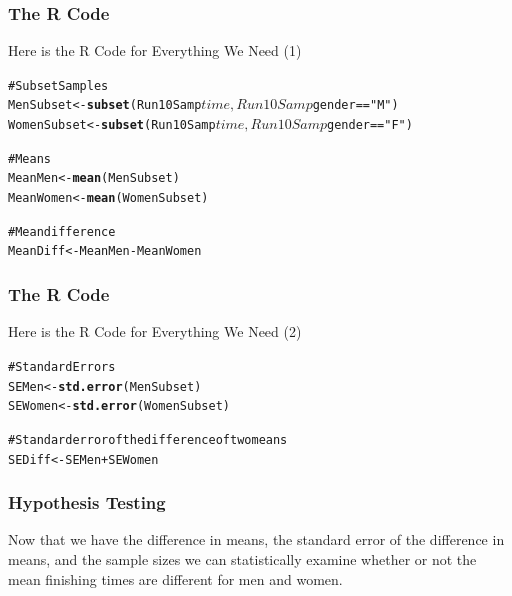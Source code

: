 \documentclass{beamer}\usepackage{graphicx, color}
\makeatletter
\newcommand{\hlfunctioncall}[1]{\textcolor[rgb]{0.501960784313725,0,0.329411764705882}{\textbf{#1}}}%
\newcommand{\hlstring}[1]{\textcolor[rgb]{0.6,0.6,1}{#1}}%
\newcommand{\hlcomment}[1]{\textcolor[rgb]{0.180392156862745,0.6,0.341176470588235}{#1}}%
\newenvironment{kframe}{%
 \def\at@end@of@kframe{}%
 \ifinner\ifhmode%
  \def\at@end@of@kframe{\end{minipage}}%
  \begin{minipage}{\columnwidth}%
 \fi\fi%
 \def\FrameCommand##1{\hskip\@totalleftmargin \hskip-\fboxsep
 \colorbox{shadecolor}{##1}\hskip-\fboxsep
     \hskip-\linewidth \hskip-\@totalleftmargin \hskip\columnwidth}%
 \MakeFramed {\advance\hsize-\width
   \@totalleftmargin\z@ \linewidth\hsize
   \@setminipage}}%
 {\par\unskip\endMakeFramed%
 \at@end@of@kframe}
\newenvironment{knitrout}{}{} %
\makeatother
\begin{document}
\begin{frame}[fragile]
  \frametitle{The R Code}
{\Large{Here is the R Code for Everything We Need (1)}}
\begin{knitrout}
\color{fgcolor}\begin{kframe}
\begin{alltt}
\hlcomment{# Subset Samples}
MenSubset <- \hlfunctioncall{subset}(Run10Samp$time, 
                       Run10Samp$gender == \hlstring{"M"})
WomenSubset <- \hlfunctioncall{subset}(Run10Samp$time, 
                       Run10Samp$gender == \hlstring{"F"})

\hlcomment{# Means}
MeanMen <- \hlfunctioncall{mean}(MenSubset)
MeanWomen <- \hlfunctioncall{mean}(WomenSubset)

\hlcomment{# Mean difference}
MeanDiff <- MeanMen - MeanWomen
\end{alltt}
\end{kframe}
\end{knitrout}

\end{frame}

\begin{frame}[fragile]
  \frametitle{The R Code}
{\Large{Here is the R Code for Everything We Need (2)}}
\begin{knitrout}
\color{fgcolor}\begin{kframe}
\begin{alltt}
\hlcomment{# Standard Errors}
SEMen <- \hlfunctioncall{std.error}(MenSubset)
SEWomen <- \hlfunctioncall{std.error}(WomenSubset)

\hlcomment{# Standard error of the difference of two means}
SEDiff <- SEMen + SEWomen
\end{alltt}
\end{kframe}
\end{knitrout}

\end{frame}

\begin{frame}[fragile]
  \frametitle{Hypothesis Testing}
{\Large{Now that we have the difference in means, the standard error of the difference in means, and the sample sizes we can statistically examine whether or not the mean finishing times are different for men and women.}}
\end{frame}
\end{document}
